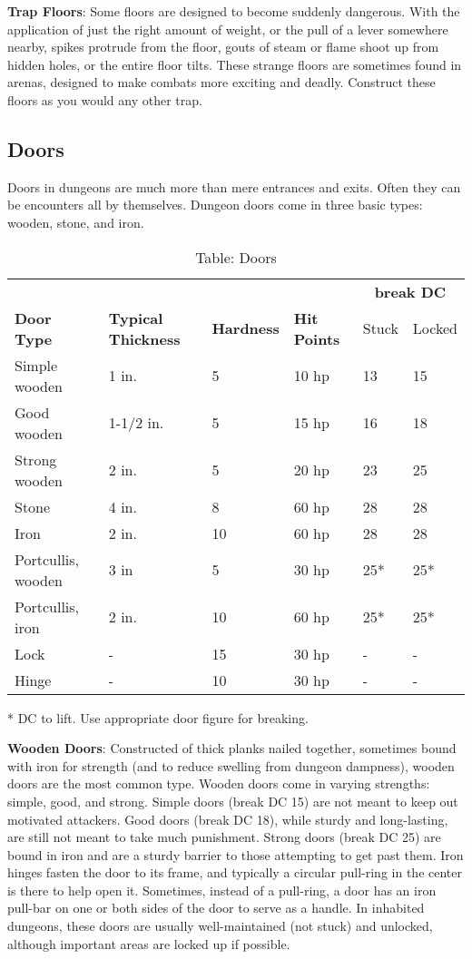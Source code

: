 \textbf{Trap Floors}: Some floors are designed to become suddenly dangerous. With the application of just the right amount of weight, or the pull of a lever somewhere nearby, spikes protrude from the floor, gouts of steam or flame shoot up from hidden holes, or the entire floor tilts. These strange floors are sometimes found in arenas, designed to make combats more exciting and deadly. Construct these floors as you would any other trap. 
				
\subsection{Doors}

				
Doors in dungeons are much more than mere entrances and exits. Often they can be encounters all by themselves. Dungeon doors come in three basic types: wooden, stone, and iron.
\begin{table}[]
\sffamily
\caption{Table: Doors}
\begin{tabular}{llllll}
                   &                            &                   &                     & \multicolumn{2}{c}{\textbf{break DC}}\\
\textbf{Door Type} & \textbf{Typical Thickness} & \textbf{Hardness} & \textbf{Hit Points} & Stuck & Locked\\

Simple wooden & 1 in. & 5 & 10 hp & 13 & 15 \\
 Good wooden & 1-1/2 in. & 5 & 15 hp & 16 & 18 \\
 Strong wooden & 2 in. & 5 & 20 hp & 23 & 25 \\
 Stone & 4 in. & 8 & 60 hp & 28 & 28 \\
 Iron & 2 in. & 10 & 60 hp & 28 & 28 \\
 Portcullis, wooden & 3 in & 5 & 30 hp & 25* & 25* \\
 Portcullis, iron & 2 in. & 10 & 60 hp & 25* & 25* \\
 Lock & - & 15 & 30 hp & - & - \\
 Hinge & - & 10 & 30 hp & - & -\\
\end{tabular}
* DC to lift. Use appropriate door figure for breaking.\\
\end{table}
				
\textbf{Wooden Doors}: Constructed of thick planks nailed together, sometimes bound with iron for strength (and to reduce swelling from dungeon dampness), wooden doors are the most common type. Wooden doors come in varying strengths: simple, good, and strong. Simple doors (break DC 15) are not meant to keep out motivated attackers. Good doors (break DC 18), while sturdy and long-lasting, are still not meant to take much punishment. Strong doors (break DC 25) are bound in iron and are a sturdy barrier to those attempting to get past them. Iron hinges fasten the door to its frame, and typically a circular pull-ring in the center is there to help open it. Sometimes, instead of a pull-ring, a door has an iron pull-bar on one or both sides of the door to serve as a handle. In inhabited dungeons, these doors are usually well-maintained (not stuck) and unlocked, although important areas are locked up if possible.
				
